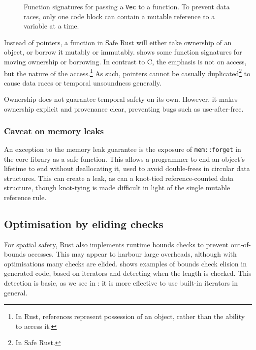 \documentclass[dissertation.tex]{subfiles}
\begin{document}
\begin{figure}[ht]
    
    \caption{
        Function signatures for passing a \texttt{Vec} to a function.
        To prevent data races, only one code block can contain a mutable
        reference to a variable at a time.
    }
    \label{lst:rust-ownership}
\end{figure}

Instead of pointers, a function in Safe Rust will either take ownership
of an object, or borrow it mutably or immutably.
 shows some function signatures for
moving ownership or borrowing.
In contrast to C, the emphasis is not on access, but the nature of the
access.\footnote{In Rust, references represent possession of an object,
rather than the ability to access it.}
As such, pointers cannot be casually duplicated\footnote{In Safe Rust.}
to cause data races or temporal unsoundness generally.

Ownership does not guarantee temporal safety on its own.
However, it makes ownership explicit and provenance clear, preventing
bugs such as use-after-free.

\subsubsection{Caveat on memory leaks}
An exception to the memory leak guarantee is the exposure of
\texttt{mem::forget} in the core library as a safe function.
This allows a programmer to end an object's lifetime to end without
deallocating it, used to avoid double-frees in circular data structures.
This can create a leak, as can a knot-tied reference-counted data
structure, though knot-tying is made difficult in light of the single
mutable reference rule.


\subsection{Optimisation by eliding checks}
\label{sec:rust-elision}

For spatial safety, Rust also implements runtime bounds checks to
prevent out-of-bounds accesses.
This may appear to harbour large overheads, although with optimisations
many checks are elided.
 shows examples of bounds check elision in
generated code, based on iterators and detecting when the length is
checked.
This detection is basic, as we see in : it
is more effective to use built-in iterators in general.
\end{document}
